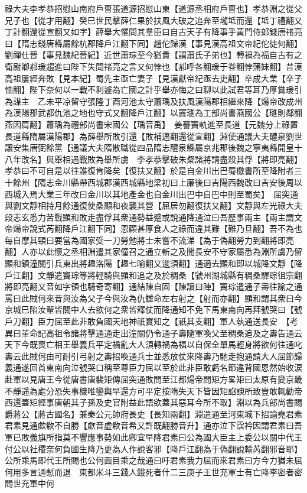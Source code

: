 祿大夫李孝恭招慰山南府戶曹張道源招慰山東【道源丞相府戶曹也】孝恭淵之從父兄子也【從才用翻】癸巳世民擊薛仁果於扶風大破之追奔至壠坻而還【坻丁禮翻又丁計翻還從宣翻又如字】薛舉大懼問其羣臣曰自古天子有降事乎黃門侍郎錢唐禇亮曰【隋志錢唐縣屬餘杭郡降戶江翻下同】趙佗歸漢【事見漢高祖文帝紀佗徒何翻】劉禪仕晉【事見魏紀晉紀】近世蕭琮至今猶貴【謂蕭氏子弟也】轉禍為福自古有之衛尉卿郝瑗趨進曰陛下失問禇亮之言又何悖也【郝呼各翻瑗于眷翻悖蒲妹翻】昔漢高祖屢經奔敗【見本紀】蜀先主亟亡妻子【見漢獻帝紀亟去吏翻】卒成大業【卒子恤翻】陛下奈何以一戰不利遽為亡國之計乎舉亦悔之曰聊以此試君等耳乃厚賞瑗引為謀主　乙未平凉留守張隆丁酉河池太守蕭瑀及扶風漢陽郡相繼來降【煬帝改成州為漢陽郡武都仇池之地也守式又翻降戶江翻】以竇璡為工部尚書燕國公【璡則鄰翻燕因肩翻】蕭瑀為禮部尚書宋國公【瑀音禹】　姜謩竇軌進至長道【元魏分上祿置長道縣隋屬漢陽郡】為薛舉所敗引還【敗補邁翻還從宣翻】淵使通議大夫醴泉劉世讓安集唐弼餘黨【通議大夫隋散職從四品隋志醴泉縣屬京兆郡後魏之寧夷縣開皇十八年改名】與舉相遇戰敗為舉所虜　李孝恭擊破朱粲諸將請盡殺其俘【將即亮翻】孝恭曰不可自是以往誰復肯降矣【復扶又翻】於是自金川出巴蜀檄書所至降附者三十餘州【隋志金川縣帶西城郡漢西城縣地梁初曰上廉後曰吉陽西魏改曰吉安後周以西城入焉大業三年改曰金川以其地產金也自金川出巴中自巴中則至蜀矣】　屈突通與劉文靜相持月餘通復使桑顯和夜襲其營【屈居勿翻復扶又翻】文靜與左光祿大夫段志玄悉力苦戰顯和敗走盡俘其衆通勢益蹙或說通降通泣曰吾歷事兩主【兩主謂文帝煬帝說式芮翻降戶江翻下同】恩顧甚厚食人之祿而違其難【難乃旦翻】吾不為也每自摩其頸曰要當為國家受一刀勞勉將士未嘗不流涕【為于偽翻勞力到翻將即亮翻】人亦以此懷之丞相淵遣其家僮召之通立斬之及聞長安不守家屬悉為淵所虜乃留顯和鎮潼關引兵東出將趣洛陽【趣七喻翻又逡須翻】通適去顯和即以城降文靜【降戶江翻】文靜遣竇琮等將輕騎與顯和追之及於稠桑【虢州湖城縣有稠桑驛琮徂宗翻將即亮翻又音如字領也騎奇寄翻】通結陳自固【陳讀曰陣】竇琮遣通子壽往諭之通罵曰此賊何來昔與汝為父子今與汝為仇讎命左右射之【射而亦翻】顯和謂其衆曰今京城巳陷汝輩皆關中人去欲何之衆皆釋仗而降通知不免下馬東南向再拜號哭曰【號戶刀翻】臣力屈至此非敢負國天地神祇實知之【祇其支翻】軍人執通送長安　【考異曰革命記高祖令諸將擊通通走出潼關仍令通子壽隨軍喚父至稠桑追及之夀告通云天下今既喪亡相王舉義兵平定禍亂大人須轉禍為福以自保全單馬輕身將欲何往通叱夀云此賊何由可耐引弓射之夀招喚通兵士並悉放仗來降夀乃馳走抱通請大人屈節歸義通遂回首東南向泣號哭口稱至尊臣力屈以至於此非臣敢虧名節違背國恩然始收涙赴軍以見唐王今從唐書唐裴矩傳屈突通敗問至江都煬帝問矩方畧矩曰太原有變京畿不靜遥為處分恐失事機唯鑾輿早還方可平定按隋失天下皆因矩諂諛所致豈敢輒勸帝西還蓋矩經事唐朝其子孫及史官附益此語欲蓋其惡耳今所不取】淵以為兵部尚書賜爵蔣公【蔣古國名】兼秦公元帥府長史【長知兩翻】淵遣通至河東城下招諭堯君素君素見通歔欷不自勝【歔音虚欷音希又許既翻勝音升】通亦泣下霑衿因謂君素曰吾軍已敗義旗所指莫不響應事勢如此卿宜早降君素曰公為國大臣主上委公以關中代王付公以社稷奈何負國生降乃更為人作說客邪【降戶江翻為于偽翻說輸芮翻邪音耶】公所乘馬即代王所賜也公何面目乘之哉通曰吁君素我力屈而來君素曰方今力猶未屈何用多言通慙而退　東都米斗三錢人餓死者什二三庚子王世充軍士有亡降李密者密問世充軍中何

